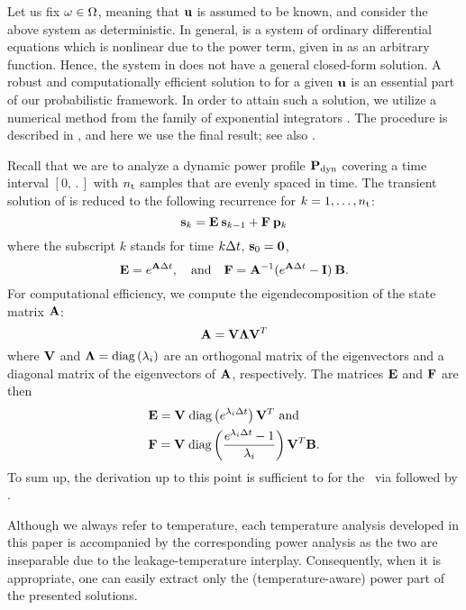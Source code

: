 Let us fix $\omega \in \Omega$, meaning that $\mathbf{u}$ is assumed to be known, and consider the above system as deterministic.
In general,  is a system of ordinary differential equations which is nonlinear due to the power term, given in  as an arbitrary function.
Hence, the system in  does not have a general closed-form solution.
A robust and computationally efficient solution to  for a given $\mathbf{u}$ is an essential part of our probabilistic framework.
In order to attain such a solution, we utilize a numerical method from the family of exponential integrators \cite{hochbruck2010}.
The procedure is described in , and here we use the final result; see also \cite{ukhov2012, ukhov2014}.

Recall that we are to analyze a dynamic power profile $\mathbf{P}_{\text{dyn}}$ covering a time interval $[0, \period]$ with ${n_\text{t}}$ samples that are evenly spaced in time.
The transient solution of  is reduced to the following recurrence for $k = 1, \dots, {n_\text{t}}$:
\begin{equation} \elab{recurrence}
  \vs_k = \mE \: \vs_{k - 1} + \mF \: \vp_k
\end{equation}
where the subscript $k$ stands for time $k \Delta t$, $\mathbf{s}_0 = \mathbf{0}$,
\[
  \mathbf{E} = e^{\mathbf{A} \Delta t}, \hspace{1em} \text{and} \hspace{1em} \mathbf{F} = \mathbf{A}^{-1} (e^{\mathbf{A} \Delta t} - \mathbf{I}) \: \mathbf{B}.
\]
For computational efficiency, we compute the eigendecomposition of the state matrix $\mathbf{A}$:
\begin{equation} \elab{eigendecomposition}
  \mA = \mEDV \mEDL \mEDV^T
\end{equation}
where $\mathbf{V}$ and $\mathbf{\Lambda} = \text{diag}\left( \lambda_i \right)$ are an orthogonal matrix of the eigenvectors and a diagonal matrix of the eigenvectors of $\mathbf{A}$, respectively.
The matrices $\mathbf{E}$ and $\mathbf{F}$ are then
\begin{align*}
  & \mathbf{E} = \mathbf{V} \; \text{diag}\left( e^{\lambda_i \Delta t} \right) \mathbf{V}^T \text{ and} \\
  & \mathbf{F} = \mathbf{V} \; \text{diag}\left(  \frac{e^{\lambda_i \Delta t} - 1}{\lambda_i}  \right) \mathbf{V}^T \mathbf{B}.
\end{align*}
To sum up, the derivation up to this point is sufficient to for the \tta\ via  followed by .
\begin{remark}
Although we always refer to temperature, each temperature analysis developed in this paper is accompanied by the corresponding power analysis as the two are inseparable due to the leakage-temperature interplay.
Consequently, when it is appropriate, one can easily extract only the (temperature-aware) power part of the presented solutions.
\end{remark}

